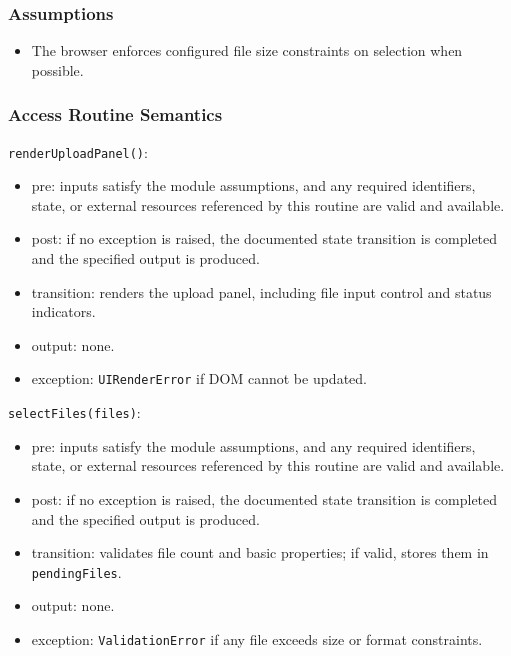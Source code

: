 \documentclass[12pt, titlepage]{article}
\begin{document}
\subsubsection{Assumptions}
\begin{itemize}
    \item The browser enforces configured file size constraints on selection when possible.
\end{itemize}

\subsubsection{Access Routine Semantics}

\noindent \texttt{renderUploadPanel()}:
\begin{itemize}
    \item pre: inputs satisfy the module assumptions, and any required identifiers, state, or external resources referenced by this routine are valid and available.
    \item post: if no exception is raised, the documented state transition is completed and the specified output is produced.
    \item transition: renders the upload panel, including file input control and status indicators.
    \item output: none.
    \item exception: \texttt{UIRenderError} if DOM cannot be updated.
\end{itemize}

\noindent \texttt{selectFiles(files)}:
\begin{itemize}
    \item pre: inputs satisfy the module assumptions, and any required identifiers, state, or external resources referenced by this routine are valid and available.
    \item post: if no exception is raised, the documented state transition is completed and the specified output is produced.
    \item transition: validates file count and basic properties; if valid, stores them in \texttt{pendingFiles}.
    \item output: none.
    \item exception: \texttt{ValidationError} if any file exceeds size or format constraints.
\end{itemize}
\end{document}

